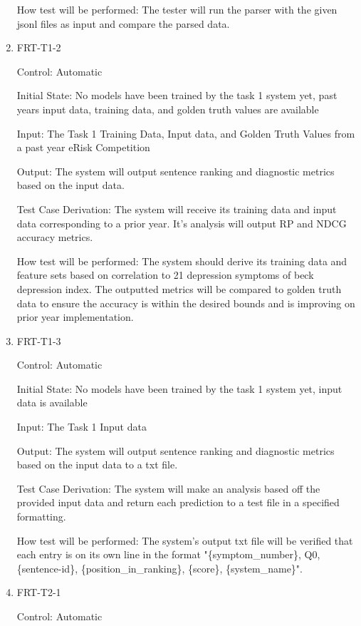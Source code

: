 \documentclass[12pt, titlepage]{article}
\begin{document}
\begin{enumerate}
How test will be performed: The tester will run the parser with the given jsonl files as input and compare the parsed data.

\item{FRT-T1-2\\}

Control: Automatic

Initial State: No models have been trained by the task 1 system yet, past years input data, training data, and golden truth values are available

Input: The Task 1 Training Data, Input data, and Golden Truth Values from a past year eRisk Competition

Output: The system will output sentence ranking and diagnostic metrics based on the input data. 

Test Case Derivation: The system will receive its training data and input data corresponding to a prior year. It's analysis will output RP and NDCG accuracy metrics.

How test will be performed: The system should derive its training data and feature sets based on correlation to 21 depression symptoms of beck depression index. The outputted metrics will be compared to golden truth data to ensure the accuracy is within the desired bounds and is improving on prior year implementation.

\item{FRT-T1-3\\}

Control: Automatic

Initial State: No models have been trained by the task 1 system yet, input data is available

Input: The Task 1 Input data

Output: The system will output sentence ranking and diagnostic metrics based on the input data to a txt file.

Test Case Derivation: The system will make an analysis based off the provided input data and return each prediction to a test file in a specified formatting.

How test will be performed: The system's output txt file will be verified that each entry is on its own line in the format "\{symptom\_number\}, Q0, \{sentence-id\}, \{position\_in\_ranking\}, \{score\}, \{system\_name\}".

\item{FRT-T2-1\\}

Control: Automatic


\end{enumerate}
\end{document}
